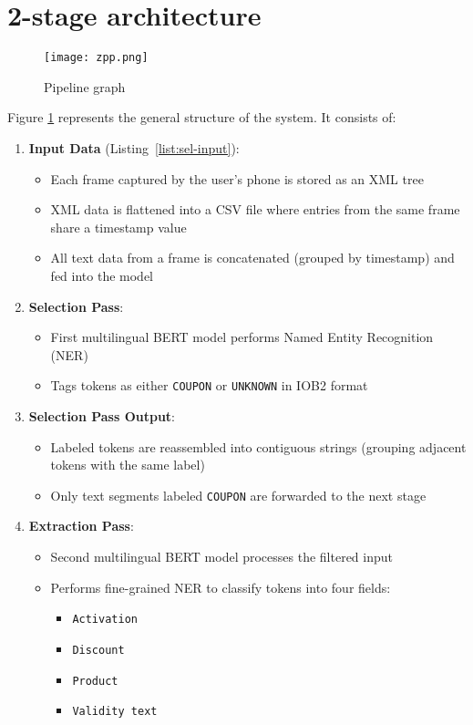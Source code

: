 \documentclass[licencjacka,en]{pracamgr}
\begin{document}
\section{2-stage architecture}
\begin{figure}
    \centering
    \texttt{[image: zpp.png]}
    \caption{Pipeline graph}
    \label{fig:zpp}
\end{figure}
Figure \ref{fig:zpp} represents the general structure of the system. It consists of:
\begin{enumerate}
    \item \textbf{Input Data} (Listing~\ref{list:sel-input}):
    \begin{itemize}
        \item Each frame captured by the user's phone is stored as an XML tree
        \item XML data is flattened into a CSV file where entries from the same frame share a timestamp value
        \item All text data from a frame is concatenated (grouped by timestamp) and fed into the model
    \end{itemize}

    \item \textbf{Selection Pass}:
    \begin{itemize}
        \item First multilingual BERT model performs Named Entity Recognition (NER)
        \item Tags tokens as either \texttt{COUPON} or \texttt{UNKNOWN} in IOB2 format~\cite{iob2}
    \end{itemize}

    \item \textbf{Selection Pass Output}:
    \begin{itemize}
        \item Labeled tokens are reassembled into contiguous strings (grouping adjacent tokens with the same label)
        \item Only text segments labeled \texttt{COUPON} are forwarded to the next stage
    \end{itemize}

    \item \textbf{Extraction Pass}:
    \begin{itemize}
        \item Second multilingual BERT model processes the filtered input
        \item Performs fine-grained NER to classify tokens into four fields:
        \begin{itemize}
            \item \texttt{Activation}
            \item \texttt{Discount}
            \item \texttt{Product}
            \item \texttt{Validity text}
        \end{itemize}
    \end{itemize}


\end{enumerate}
\end{document}
